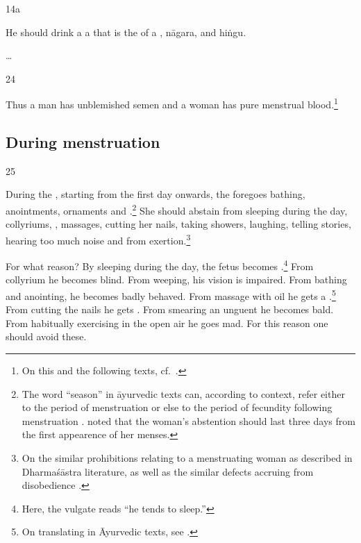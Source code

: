 \begin{translation}
 \item[14a] 
 
 He should drink a a  that is the
 of  a , \gls{nāgara},
and \gls{hiṅgu}.
 
\item[\ldots] 
 
\item[24]

Thus a man has unblemished semen and a woman has pure menstrual 
blood.\footnote{On this and the following texts, cf.\ \cite[389 et 
passim]{smet-2010}.}
 
 \subsection{During menstruation}
 
 \item[25]
 
During the , starting from the first day onwards, the
 foregoes bathing, anointments,
ornaments and .\footnote{The word 
    “season” in āyurvedic texts can, according to context, refer either to
    the period of menstruation or else to the period of fecundity
    following menstruation \citep[15\,ff., note 27, \emph{et
    passim}]{das-2003}.  noted that the woman's
    abstention should last three days from the first appearence of her
    menses.} She should abstain from sleeping during the day, collyriums,
    , massages, cutting her nails, taking
    showers, laughing, telling stories, hearing too much noise and from
    exertion.\footnote{On the similar prohibitions relating to a
        menstruating woman as described in Dharmaśāstra literature, as well as
        the similar defects accruing from disobedience         
        \citep[see][284--287]{lesl-1989}.}
        
For what reason?  By sleeping during the day, the fetus becomes
.\footnote{Here, the vulgate reads  “he
    tends to sleep.”} From collyrium he becomes blind.  From weeping, his
    vision is impaired. From bathing and anointing, he becomes badly
    behaved. From massage with oil he gets a .\footnote{On translating  in Āyurvedic texts, see
        \cite[96\,ff]{emme-1984}.} From cutting the nails he gets
        .  From smearing an unguent he becomes bald.
        From habitually exercising in the open air he goes mad. For this
        reason one should avoid these.
    

\end{translation}
